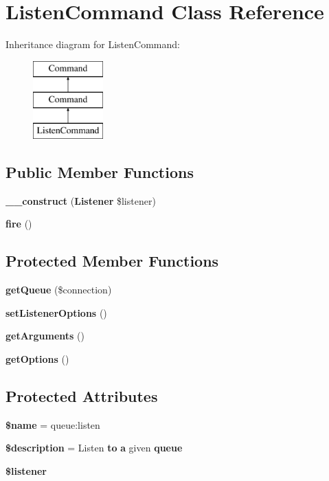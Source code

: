 \section{Listen\+Command Class Reference}
\label{class_illuminate_1_1_queue_1_1_console_1_1_listen_command}
Inheritance diagram for Listen\+Command\+:\begin{figure}[H]
\begin{center}
\leavevmode
\includegraphics[height=3.000000cm]{class_illuminate_1_1_queue_1_1_console_1_1_listen_command}
\end{center}
\end{figure}
\subsection*{Public Member Functions}
\begin{DoxyCompactItemize}
\item 
{\bf \+\_\+\+\_\+construct} ({\bf Listener} \$listener)
\item 
{\bf fire} ()
\end{DoxyCompactItemize}
\subsection*{Protected Member Functions}
\begin{DoxyCompactItemize}
\item 
{\bf get\+Queue} (\$connection)
\item 
{\bf set\+Listener\+Options} ()
\item 
{\bf get\+Arguments} ()
\item 
{\bf get\+Options} ()
\end{DoxyCompactItemize}
\subsection*{Protected Attributes}
\begin{DoxyCompactItemize}
\item 
{\bf \$name} = \textquotesingle{}queue\+:listen\textquotesingle{}
\item 
{\bf \$description} = \textquotesingle{}Listen {\bf to} {\bf a} given {\bf queue}\textquotesingle{}
\item 
{\bf \$listener}
\end{DoxyCompactItemize}


